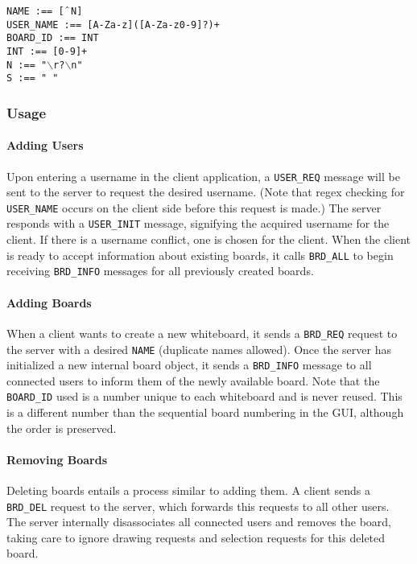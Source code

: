 \texttt{NAME :== [$\char`\^$N]}\\
\texttt{USER\_NAME :== [A-Za-z]([A-Za-z0-9]?)+}\\
\texttt{BOARD\_ID :== INT}\\

\texttt{INT :== [0-9]+}\\
\texttt{N :== "$\backslash$r?$\backslash$n"}\\
\texttt{S :== " "}\\

\setlength{\parindent}{15pt} %


\subsubsection{Usage}

\paragraph{Adding Users} Upon entering a username in the client application, a \texttt{USER\_REQ} message will be sent to the server to request the desired username. (Note that regex checking for \texttt{USER\_NAME} occurs on the client side before this request is made.) The server responds with a \texttt{USER\_INIT} message, signifying the acquired username for the client. If there is a username conflict, one is chosen for the client. When the client is ready to accept information about existing boards, it calls \texttt{BRD\_ALL} to begin receiving \texttt{BRD\_INFO} messages for all previously created boards.

\paragraph{Adding Boards} When a client wants to create a new whiteboard, it sends a \texttt{BRD\_REQ} request to the server with a desired \texttt{NAME} (duplicate names allowed). Once the server has initialized a new internal board object, it sends a \texttt{BRD\_INFO} message to all connected users to inform them of the newly available board. Note that the \texttt{BOARD\_ID} used is a number unique to each whiteboard and is never reused. This is a different number than the sequential board numbering in the GUI, although the order is preserved.

\paragraph{Removing Boards} Deleting boards entails a process similar to adding them. A client sends a \texttt{BRD\_DEL} request to the server, which forwards this requests to all other users. The server internally disassociates all connected users and removes the board, taking care to ignore drawing requests and selection requests for this deleted board.

